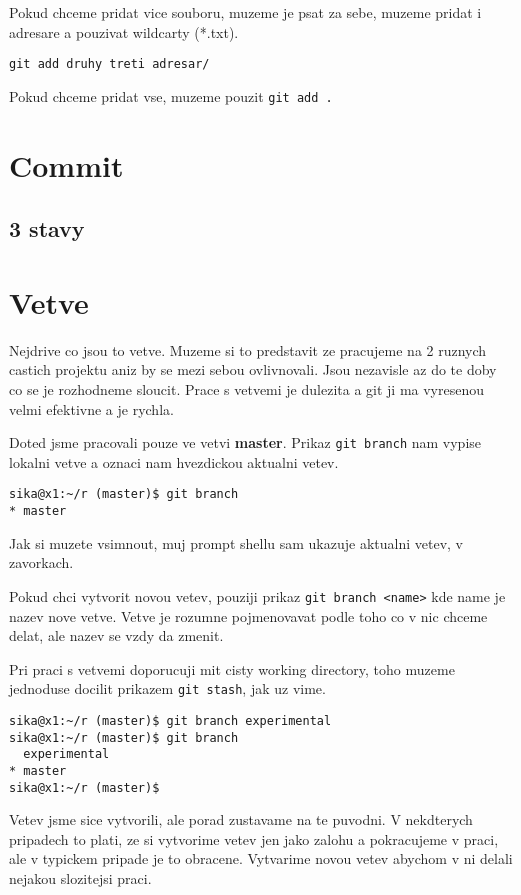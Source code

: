 \documentclass[12pt,a5paper]{article}
\begin{document}
Pokud chceme pridat vice souboru, muzeme je psat za sebe, muzeme pridat i adresare a pouzivat wildcarty (*.txt).

\begin{lstlisting}
git add druhy treti adresar/
\end{lstlisting}

Pokud chceme pridat vse, muzeme pouzit \lstinline|git add .|

\section{Commit}
\subsection{3 stavy}

\section{Vetve}

Nejdrive co jsou to vetve. Muzeme si to predstavit ze pracujeme na 2 ruznych castich projektu aniz by se mezi sebou ovlivnovali. Jsou nezavisle az do te doby co se je rozhodneme sloucit. Prace s vetvemi je dulezita a git ji ma vyresenou velmi efektivne a je rychla.

Doted jsme pracovali pouze ve vetvi {\bf master}. Prikaz \lstinline|git branch| nam vypise lokalni vetve a oznaci nam hvezdickou aktualni vetev.

\begin{lstlisting}
sika@x1:~/r (master)$ git branch
* master
\end{lstlisting}

Jak si muzete vsimnout, muj prompt shellu sam ukazuje aktualni vetev, v zavorkach.

Pokud chci vytvorit novou vetev, pouziji prikaz \lstinline|git branch <name>| kde name je nazev nove vetve. Vetve je rozumne pojmenovavat podle toho co v nic chceme delat, ale nazev se vzdy da zmenit.

Pri praci s vetvemi doporucuji mit cisty working directory, toho muzeme jednoduse docilit prikazem \lstinline|git stash|, jak uz vime.

\begin{lstlisting}
sika@x1:~/r (master)$ git branch experimental
sika@x1:~/r (master)$ git branch
  experimental
* master
sika@x1:~/r (master)$
\end{lstlisting}

Vetev jsme sice vytvorili, ale porad zustavame na te puvodni. V nekdterych pripadech to plati, ze si vytvorime vetev jen jako zalohu a pokracujeme v praci, ale v typickem pripade je to obracene. Vytvarime novou vetev abychom v ni delali nejakou slozitejsi praci.
\end{document}
